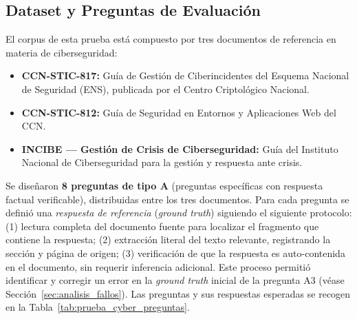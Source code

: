 \subsection{Dataset y Preguntas de Evaluación}

El corpus de esta prueba está compuesto por tres documentos de referencia en materia de ciberseguridad:

\begin{itemize}
    \item \textbf{CCN-STIC-817:} Guía de Gestión de Ciberincidentes del Esquema Nacional de Seguridad (ENS), publicada por el Centro Criptológico Nacional.
    \item \textbf{CCN-STIC-812:} Guía de Seguridad en Entornos y Aplicaciones Web del CCN.
    \item \textbf{INCIBE — Gestión de Crisis de Ciberseguridad:} Guía del Instituto Nacional de Ciberseguridad para la gestión y respuesta ante crisis.
\end{itemize}

Se diseñaron \textbf{8 preguntas de tipo A} (preguntas específicas con respuesta factual verificable), distribuidas entre los tres documentos. Para cada pregunta se definió una \textit{respuesta de referencia} (\textit{ground truth}) siguiendo el siguiente protocolo: (1) lectura completa del documento fuente para localizar el fragmento que contiene la respuesta; (2) extracción literal del texto relevante, registrando la sección y página de origen; (3) verificación de que la respuesta es auto-contenida en el documento, sin requerir inferencia adicional. Este proceso permitió identificar y corregir un error en la \textit{ground truth} inicial de la pregunta A3 (véase Sección~\ref{sec:analisis_fallos}). Las preguntas y sus respuestas esperadas se recogen en la Tabla~\ref{tab:prueba_cyber_preguntas}.

